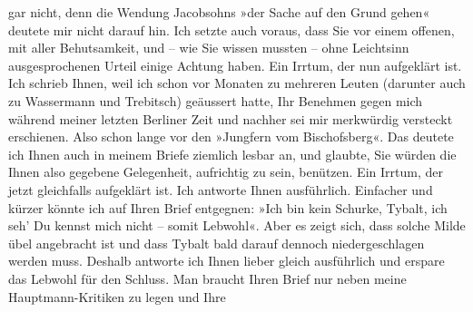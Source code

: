\begin{ledgroupsized}[t]{13cm}
               gar nicht, denn die Wendung Jacobsohns »der
               Sache auf den Grund gehen« deutete mir nicht darauf hin. Ich setzte auch voraus, dass
               Sie vor einem offenen, mit aller Behutsamkeit, und – wie Sie wissen mussten – ohne
               Leichtsinn ausgesprochenen Urteil einige Achtung haben. Ein Irrtum, der nun
               aufgeklärt ist.\pend
           \pstart
           Ich schrieb Ihnen, weil ich schon vor Monaten zu mehreren Leuten (darunter auch zu
                  Wassermann und Trebitsch) geäussert hatte, Ihr Benehmen gegen mich während
               meiner letzten Berliner Zeit und nachher sei mir
               merkwürdig versteckt erschienen. Also schon lange vor den »Jungfern vom Bischofsberg«. Das deutete ich Ihnen auch in
               meinem Briefe ziemlich lesbar an, und glaubte, Sie würden die Ihnen also gegebene
               Gelegenheit, aufrichtig zu sein, benützen. Ein Irrtum, der jetzt gleichfalls
               aufgeklärt ist.\pend
           \pstart
           Ich antworte Ihnen ausführlich. Einfacher und kürzer {\pb}könnte ich auf Ihren Brief
               entgegnen: »Ich bin kein Schurke,
                  Tybalt, ich seh’ Du kennst mich nicht – somit Lebwohl«. Aber es zeigt sich, dass
               solche Milde übel angebracht ist und dass Tybalt bald darauf dennoch niedergeschlagen werden muss.
               Deshalb antworte ich Ihnen lieber gleich ausführlich und erspare das Lebwohl für den
               Schluss.\pend
           \pstart
           Man braucht Ihren Brief nur neben meine Hauptmann-Kritiken zu legen und Ihre

\end{ledgroupsized}
